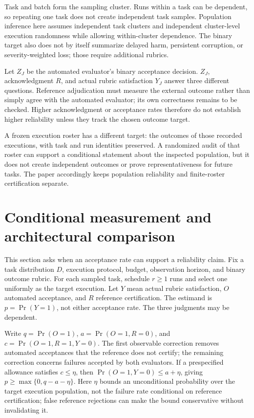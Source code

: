 \documentclass[11pt]{article}
\begin{document}
Task and batch form the sampling cluster. Runs within a task can be dependent, so repeating one task does not create independent task samples. Population inference here assumes independent task clusters and independent cluster-level execution randomness while allowing within-cluster dependence. The binary target also does not by itself summarize delayed harm, persistent corruption, or severity-weighted loss; those require additional rubrics.

Let $Z_J$ be the automated evaluator's binary acceptance decision. $Z_J$, acknowledgment $R$, and actual rubric satisfaction $Y_J$ answer three different questions. Reference adjudication must measure the external outcome rather than simply agree with the automated evaluator; its own correctness remains to be checked. Higher acknowledgment or acceptance rates therefore do not establish higher reliability unless they track the chosen outcome target.

A frozen execution roster has a different target: the outcomes of those recorded executions, with task and run identities preserved. A randomized audit of that roster can support a conditional statement about the inspected population, but it does not create independent outcomes or prove representativeness for future tasks. The paper accordingly keeps population reliability and finite-roster certification separate.

\section{Conditional measurement and architectural comparison}
This section asks when an acceptance rate can support a reliability claim. Fix a task distribution $D$, execution protocol, budget, observation horizon, and binary outcome rubric. For each sampled task, schedule $r\geq 1$ runs and select one uniformly as the target execution. Let $Y$ mean actual rubric satisfaction, $O$ automated acceptance, and $R$ reference certification. The estimand is $p=\Pr(Y=1)$, not either acceptance rate. The three judgments may be dependent.

Write $q=\Pr(O=1)$, $a=\Pr(O=1,R=0)$, and $c=\Pr(O=1,R=1,Y=0)$. The first observable correction removes automated acceptances that the reference does not certify; the remaining correction concerns failures accepted by both evaluators. If a prespecified allowance satisfies $c\leq\eta$, then $\Pr(O=1,Y=0)\leq a+\eta$, giving $p\geq\max\{0,q-a-\eta\}$. Here $\eta$ bounds an unconditional probability over the target execution population, not the failure rate conditional on reference certification; false reference rejections can make the bound conservative without invalidating it.
\end{document}
